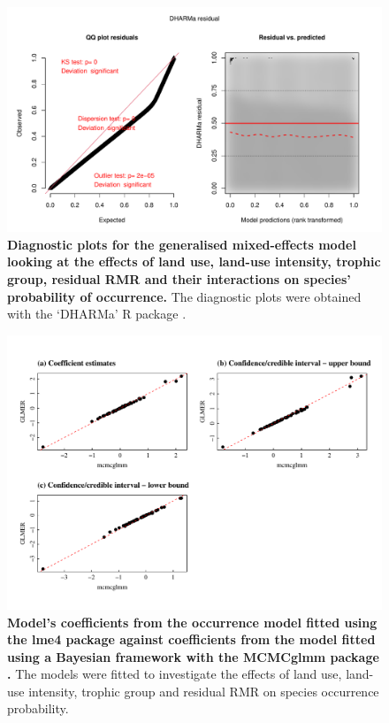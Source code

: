 \begin{figure}[h!]
\centering
\includegraphics[scale=0.7]{Supporting/Chapter5/Figures/Diagnostic_plot_occurrence}
\caption[Diagnostic plots for the generalised mixed-effects model looking at the effects of land use, land-use intensity, trophic group, residual RMR and their interactions on species' probability of occurrence]{\textbf{Diagnostic plots for the generalised mixed-effects model looking at the effects of land use, land-use intensity, trophic group, residual RMR and their interactions on species' probability of occurrence.} The diagnostic plots were obtained with the `DHARMa' R package \citep{DHARMa}.}
\label{SI5_figure6}
\end{figure}

\begin{figure}[h!]
\centering
\includegraphics[scale=0.8]{Supporting/Chapter5/Figures/Occurrence_model_GLMER_mcmcglmm_coefs}
\caption[Model's coefficients from the occurrence model fitted using the lme4 package against coefficients from the model fitted using the MCMCglmm package]{\textbf{Model's coefficients from the occurrence model fitted using the lme4 package \citep{Bates2015} against coefficients from the model fitted using a Bayesian framework with the MCMCglmm package \citep{mcmcglmm}.} The models were fitted to investigate the effects of land use, land-use intensity, trophic group and residual RMR on species occurrence probability.}
\label{SI5_figure7}
\end{figure}

